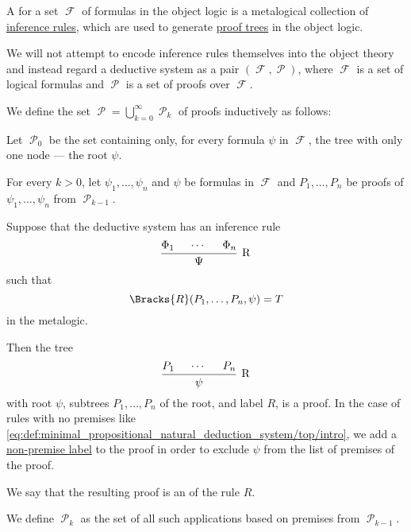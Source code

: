 \begin{definition}\label{def:deductive_system}\mimprovised
  A  for a set \( \mscrF \) of formulas in the object logic is a metalogical collection of \hyperref[con:judgment/inference_rule]{inference rules}, which are used to generate \hyperref[def:proof_tree]{proof trees} in the object logic.

  We will not attempt to encode inference rules themselves into the object theory and instead regard a deductive system as a pair \( (\mscrF, \mscrP) \), where \( \mscrF \) is a set of logical formulas and \( \mscrP \) is a set of proofs over \( \mscrF \).

  We define the set \( \mscrP = \bigcup_{k=0}^\infty \mscrP_k \) of proofs inductively as follows:
  \begin{thmenum}
     Let \( \mscrP_0 \) be the set containing only, for every formula \( \psi \) in \( \mscrF \), the tree with only one node --- the root \( \psi \).

     For every \( k > 0 \), let \( \psi_1, \ldots, \psi_n \) and \( \psi \) be formulas in \( \mscrF \) and \( P_1, \ldots, P_n \) be proofs of \( \psi_1, \ldots, \psi_n \) from \( \mscrP_{k-1} \).

    Suppose that the deductive system has an inference rule
    \begin{equation*}
      \begin{prooftree}
        \hypo{ \Phi_1 }
        \hypo{ \cdots }
        \hypo{ \Phi_n }
        \infer3[R]{ \Psi }
      \end{prooftree}
    \end{equation*}
    such that
    \begin{equation*}
      \Bracks{R}(P_1, \ldots, P_n, \psi) = T
    \end{equation*}
    in the metalogic.

    Then the tree
    \begin{equation*}
      \begin{prooftree}
        \hypo{ P_1 }
        \hypo{ \cdots }
        \hypo{ P_n }
        \infer3[R]{ \psi }
      \end{prooftree}
    \end{equation*}
    with root \( \psi \), subtrees \( P_1, \ldots, P_n \) of the root, and label \( R \), is a proof. In the case of rules with no premises like \eqref{eq:def:minimal_propositional_natural_deduction_system/top/intro}, we add a \hyperref[def:proof_tree/premises]{non-premise label} to the proof in order to exclude \( \psi \) from the list of premises of the proof.

    We say that the resulting proof is an  of the rule \( R \).

    We define \( \mscrP_k \) as the set of all such applications based on premises from \( \mscrP_{k-1} \).
  \end{thmenum}
\end{definition}

